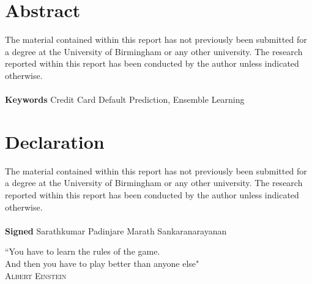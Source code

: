 \documentclass[twoside,11pt,a4paper]{article}
\begin{document}
\section*{\centering Abstract}	


The material contained within this report has not previously been
submitted for a degree at the University of Birmingham or any other university.
The research reported within this report has been conducted by the author
unless indicated otherwise.\\
\\
\textbf{Keywords} Credit Card Default Prediction, Ensemble Learning

\vfill
\clearpage

\section*{\centering Declaration}
The material contained within this report has not previously been
submitted for a degree at the University of Birmingham or any other university.
The research reported within this report has been conducted by the author
unless indicated otherwise.\\
\\
\textbf{Signed} Sarathkumar Padinjare Marath Sankaranarayanan 

\vfill
\clearpage
\begin{center}
\vspace*{\fill}
\begin{minipage}{6in}



\centering \Large{``You have to learn the rules of the game.\\ And then you have to play better than anyone else"}\\{\normalsize{\textsc{Albert Einstein}}}

  \end{minipage}
  \vspace*{\fill}
\end{center}
\end{document}

